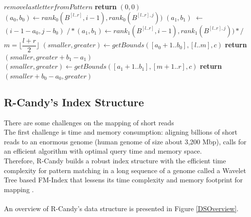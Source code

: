 \documentclass[11pt,a4paper]{report}
\begin{document}
	\begin{algorithm}[H]
   \caption{}
    \begin{algorithmic}[1] 
            	\State $remove last letter from Pattern$
            	\State \textbf{return} $(0,0)$
            \Else
        	     \State $(a_{0}, b_{0}) \leftarrow  rank_{0}( B^{[l..r]}, i-1), rank_{0}(B^{[l..r],j}))$
        		 \State $(a_{1}, b_{1})$ $\leftarrow$ $(i-1-a_{0}, j - b_{0}) $
        		 \State $/* (a_{1}, b_{1}) \leftarrow  rank_{1}( B^{[l..r]}, i-1), rank_{1}(B^{[l..r],j})) */$
        		 \State $m = \lfloor \dfrac  {l+r}{2} \rfloor$
        		 	\State $(smaller, greater) \leftarrow getBounds ([a_{0}+1..b_{0}],[l..m],c)$
        		 	\State \textbf{return} $(smaller, greater+b_{1}-a_{1})$
     	  		\Else 
     	  			\State $(smaller, greater) \leftarrow getBounds ([a_{1}+1..b_{1}],[m+1..r],c)$ 
     	  			\State \textbf{return} $(smaller + b_{0}-a_{0}, greater)$
     		   \EndIf
     	   \EndIf
     
    \EndFunction

	\end{algorithmic}
  \label{smaller-greater}	
\end{algorithm}





\subsection{R-Candy's Index Structure} \label{R-Candy's Index Structure}

There are some challenges on the mapping of short reads\\
The first challenge is time and memory consumption: aligning billions of short
reads to an enormous genome (human genome of size about 3,200 Mbp), 
calls for an efficient algorithm with optimal query time and memory space.\\
Therefore, R-Candy builds a robust index structure with 
the efficient time complexity for pattern matching in a long sequence of a genome
called a Wavelet Tree based FM-Index that lessens its time complexity and memory footprint for mapping . 
\\\\
An overview of R-Candy's data structure is presented in Figure \ref{DSOverview}\cite{Wavthesis}.\\
\end{document}
